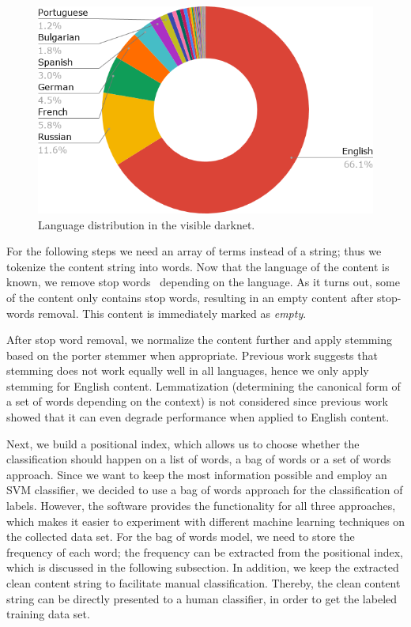 \iflncs
  \begin{figure}[H]
  \centering
  \includegraphics[width=0.6\linewidth]{images/contentsByLanguage.png}
  \caption{Language distribution in the visible darknet.}
  \label{fig:languages}
  \end{figure}
\fi

For the following steps we need an array of terms instead of a string; thus we tokenize the content string into words.
Now that the language of the content is known, we remove stop words~\cite{McDowall} depending on the language. As it turns out, some of the content only contains stop words, resulting in an empty content after stop-words removal. This content is immediately marked as \emph{empty}.

After stop word removal, we normalize the content further and apply stemming \cite{WormerStemmer} based on the porter stemmer \cite{porter1980algorithm} when appropriate. Previous work \cite{Harman1991,hull1996stemming,krovetz1996word,SaltonTextProcessing} suggests that stemming does not work equally well in all languages, hence we only apply stemming for English content. Lemmatization (determining the canonical form of a set of words depending on the context) is not considered since previous work showed that it can even degrade performance when applied to English content.

Next, we build a positional index, which allows us to choose whether the classification should happen on a list of words, a bag of words or a set of words approach. Since we want to keep the most information possible and employ an SVM classifier, we decided to use a bag of words approach for the classification of labels. However, the software provides the functionality for all three approaches, which makes it easier to experiment with different machine learning techniques on the collected data set. For the bag of words model, we need to store the frequency of each word; the frequency can be extracted from the positional index, which is discussed in the following subsection. 
In addition, we keep the extracted clean content string to facilitate manual classification. Thereby, the clean content string can be directly presented to a human classifier, in order to get the labeled training data set.
%
%
